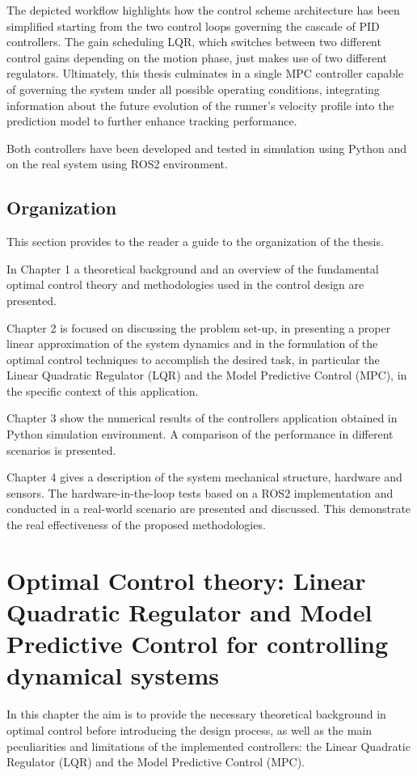\documentclass[a4paper,12pt,oneside]{book}
\begin{document}
\bigskip
The depicted workflow highlights how the control scheme architecture has been simplified starting from the two control loops governing the cascade of PID controllers. 
The gain scheduling LQR, which switches between two different control gains depending on the motion phase, just makes use of two different regulators. 
Ultimately, this thesis culminates in a single MPC controller capable of governing the system under all possible operating conditions, integrating information about the future evolution of the runner's velocity profile into the prediction model to further enhance tracking performance.

\bigskip
Both controllers have been developed and tested in simulation using Python and on the real system using ROS2 environment.

\section*{Organization}
This section provides to the reader a guide to the organization of the thesis. 

In Chapter 1 a theoretical background and an overview of the fundamental optimal control theory and methodologies used in the control design are presented. 

Chapter 2 is focused on discussing the problem set-up, in presenting a proper linear approximation of the system dynamics and in the formulation of the optimal control techniques to accomplish the desired task, in particular the Linear Quadratic Regulator (LQR) and the Model Predictive Control (MPC), in the specific context of this application.

Chapter 3 show the numerical results of the controllers application obtained in Python simulation environment. A comparison of the performance in different scenarios is presented.

Chapter 4 gives a description of the system mechanical structure, hardware and sensors. The hardware-in-the-loop tests based on a ROS2 implementation and conducted in a real-world scenario are presented and discussed.
This demonstrate the real effectiveness of the proposed methodologies.

\chapter{Optimal Control theory: Linear Quadratic Regulator and Model Predictive Control for controlling dynamical systems}
In this chapter the aim is to provide the necessary theoretical background in optimal control before introducing the design process, as well as the main peculiarities and limitations of the implemented controllers: the Linear Quadratic Regulator (LQR) and the Model Predictive Control (MPC).
\end{document}
